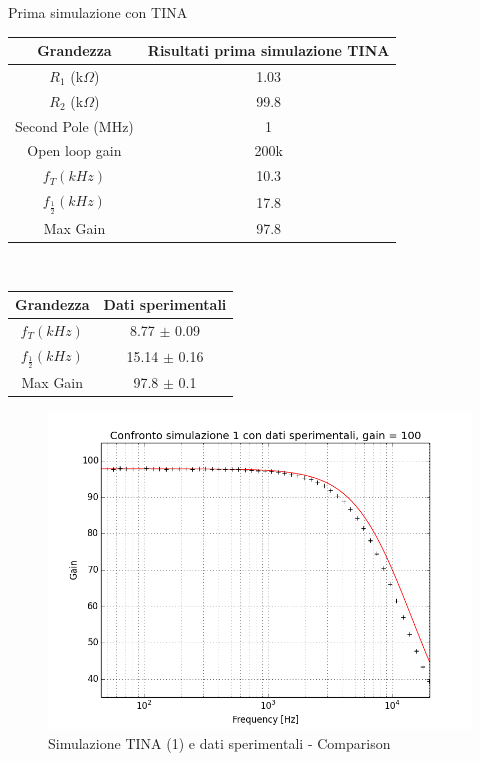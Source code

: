 \documentclass{beamer}
\begin{document}
\begin{frame}{Prima simulazione con TINA}

{
\centering
\begin{tabular}{|c|c|}
\hline 
Grandezza & Risultati prima simulazione TINA\\ 
\hline 
$R_1$ (k$\Omega$)& 1.03  \\ 
\hline 
$R_2$ (k$\Omega$) & 99.8 \\ 
\hline 
Second Pole (MHz) & 1 \\ 
\hline
Open loop gain & 200k\\
\hline 
 
$f_T (kHz)$ & 10.3 \\ 
\hline 
$f_{\frac{1}{2}} (kHz)$ & 17.8 \\ 
\hline 
Max Gain & 97.8 \\ 
\hline 
\end{tabular}\\
 
 \begin{tabular}{|c|c|}
 \hline 
 Grandezza & Dati sperimentali \\ 
 \hline 
 $f_T (kHz)$ & 8.77 $\pm$ 0.09 \\ 
 \hline 
 $f_{\frac{1}{2}} (kHz)$ & 15.14 $\pm$ 0.16 \\ 
 \hline 
 Max Gain & 97.8 $\pm$ 0.1 \\ 
 \hline 
 \end{tabular}
 
} 
 
\end{frame}

\begin{frame}
\begin{figure}
\centering
\includegraphics[width=0.9\linewidth]{./es8comparisons_nonsim}
\caption{Simulazione TINA (1) e dati sperimentali - Comparison}
\label{fig:es8comparisons_nonsim}
\end{figure}

\end{frame}
\end{document}
